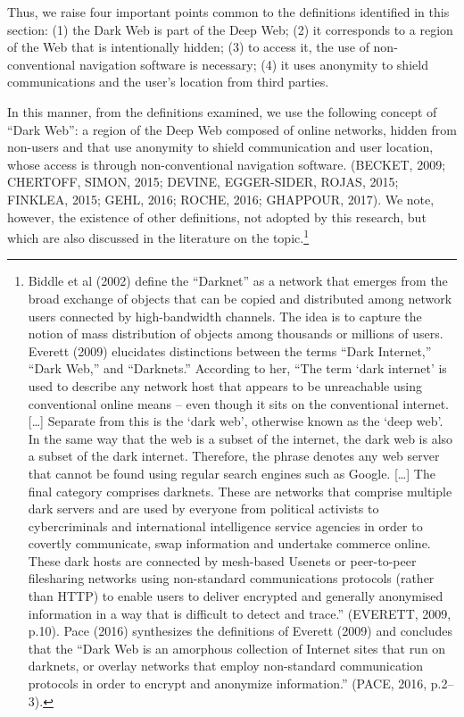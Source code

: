 Thus, we raise four important points common to the definitions identified in this section: (1) the Dark Web is part of the Deep Web; (2) it corresponds to a region of the Web that is intentionally hidden; (3) to access it, the use of non-conventional navigation software is necessary; (4) it uses anonymity to shield communications and the user's location from third parties.

In this manner, from the definitions examined, we use the following concept of ``Dark Web'': a region of the Deep Web composed of online networks, hidden from non-users and that use anonymity to shield communication and user location, whose access is through non-conventional navigation software. (BECKET, 2009; CHERTOFF, SIMON, 2015; DEVINE, EGGER-SIDER, ROJAS, 2015; FINKLEA, 2015; GEHL, 2016; ROCHE, 2016; GHAPPOUR, 2017). We note, however, the existence of other definitions, not adopted by this research, but which are also discussed in the literature on the topic.\footnote{Biddle et al (2002) define the ``Darknet'' as a network that emerges from the broad exchange of objects that can be copied and distributed among network users connected by high-bandwidth channels. The idea is to capture the notion of mass distribution of objects among thousands or millions of users. Everett (2009) elucidates distinctions between the terms ``Dark Internet,'' ``Dark Web,'' and ``Darknets.'' According to her, ``The term `dark internet' is used to describe any network host that appears to be unreachable using conventional online means -- even though it sits on the conventional internet. {[}\ldots{]} Separate from this is the `dark web', otherwise known as the `deep web'. In the same way that the web is a subset of the internet, the dark web is also a subset of the dark internet. Therefore, the phrase denotes any web server that cannot be found using regular search engines such as Google. {[}\ldots{]} The final category comprises darknets. These are networks that comprise multiple dark servers and are used by everyone from political activists to cybercriminals and international intelligence service agencies in order to covertly communicate, swap information and undertake commerce online. These dark hosts are connected by mesh-based Usenets or peer-to-peer filesharing networks using non-standard communications protocols (rather than HTTP) to enable users to deliver encrypted and generally anonymised information in a way that is difficult to detect and trace.'' (EVERETT, 2009, p.10). Pace (2016) synthesizes the definitions of Everett (2009) and concludes that the ``Dark Web is an amorphous collection of Internet sites that run on darknets, or overlay networks that employ non-standard communication protocols in order to encrypt and anonymize information.'' (PACE, 2016, p.2--3).}

